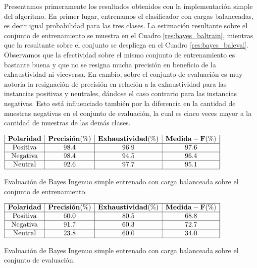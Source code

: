 Presentamos primeramente los resultados obtenidos con la implementaci\'on simple del algoritmo. En primer lugar, entrenamos el clasificador con cargas balanceadas, es decir igual probabilidad para las tres clases. La estimaci\'on resultante sobre el conjunto de entrenamiento se muestra en el Cuadro \ref{res:bayes_baltrain}, mientras que la resultante sobre el conjunto se despliega en el Cuadro \ref{res:bayes_baleval}. Observamos que la efectividad sobre el mismo conjunto de entrenamiento es bastante buena y que no se resigna mucha precisi\'on en beneficio de la exhaustividad ni viceversa. En cambio, sobre el conjunto de evaluaci\'on es muy notoria la resignaci\'on de precisi\'on en relaci\'on a la exhaustividad para las instancias positivas y neutrales, d\'andose el caso contrario para las instancias negativas. Esto est\'a influenciado tambi\'en por la diferencia en la cantidad de muestras negativas en el conjunto de evaluaci\'on, la cual es cinco veces mayor a la cantidad de muestras de las dem\'as clases.


\begin{table}[htb] 
\centering

$
\begin{array}{|c|c|c|c|}
      \hline
      \mathbf{Polaridad} & \mathbf{Precisi\acute{o}n(\%)} & \mathbf{Exhaustividad(\%)} & \mathbf{Medida-F(\%)}	\\
      \hline
      \mathrm{Positiva}  & 98.4	& 96.9 & 97.6	\\
      \hline
      \mathrm{Negativa}  & 98.4 & 94.5 & 96.4	\\
      \hline
      \mathrm{Neutral}	 & 92.6 & 97.7 & 95.1	\\
      \hline
\end{array}
$
\caption{Evaluaci\'on de Bayes Ingenuo simple entrenado con carga balanceada sobre el conjunto de entrenamiento.}
\label{res:bayes_baltrain}
\end{table}

\begin{table}[htb] 
\centering

$
\begin{array}{|c|c|c|c|}
      \hline
      \mathbf{Polaridad} & \mathbf{Precisi\acute{o}n(\%)} & \mathbf{Exhaustividad(\%)} & \mathbf{Medida-F(\%)}	\\
      \hline
      \mathrm{Positiva}  & 60.0	& 80.5 & 68.8 \\
      \hline
      \mathrm{Negativa}  & 91.7 & 60.3 & 72.7 \\
      \hline
      \mathrm{Neutral}	 & 23.8 & 60.0 & 34.0 \\
      \hline
\end{array}
$
\caption{Evaluaci\'on de Bayes Ingenuo simple entrenado con carga balanceada sobre el conjunto de evaluaci\'on.}
\label{res:bayes_baleval}
\end{table}

